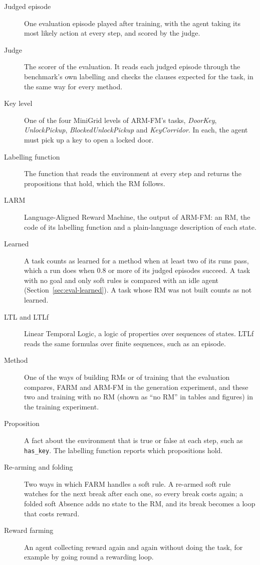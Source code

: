 \documentclass[11pt,english,listoffigures,listoftables]{tfgetsinf}
\newcommand{\env}[1]{\textsf{\slshape #1}}  %
\begin{document}
\begin{description}
    \item[Judged episode] One evaluation episode played after training, with the agent taking its most likely action at every step, and scored by the judge.
    \item[Judge] The scorer of the evaluation. It reads each judged episode through the benchmark's own labelling and checks the clauses expected for the task, in the same way for every method.
    \item[Key level] One of the four MiniGrid levels of ARM-FM's tasks, \env{DoorKey}, \env{UnlockPickup}, \env{BlockedUnlockPickup} and \env{KeyCorridor}. In each, the agent must pick up a key to open a locked door.
    \item[Labelling function] The function that reads the environment at every step and returns the propositions that hold, which the RM follows.
    \item[LARM] Language-Aligned Reward Machine, the output of ARM-FM: an RM, the code of its labelling function and a plain-language description of each state.
    \item[Learned] A task counts as learned for a method when at least two of its runs pass, which a run does when 0.8 or more of its judged episodes succeed. A task with no goal and only soft rules is compared with an idle agent (Section~\ref{sec:eval-learned}). A task whose RM was not built counts as not learned.
    \item[LTL and LTLf] Linear Temporal Logic, a logic of properties over sequences of states. LTLf reads the same formulas over finite sequences, such as an episode.
    \item[Method] One of the ways of building RMs or of training that the evaluation compares, FARM and ARM-FM in the generation experiment, and these two and training with no RM (shown as ``no RM'' in tables and figures) in the training experiment.
    \item[Proposition] A fact about the environment that is true or false at each step, such as \texttt{has\_key}. The labelling function reports which propositions hold.
    \item[Re-arming and folding] Two ways in which FARM handles a soft rule. A re-armed soft rule watches for the next break after each one, so every break costs again; a folded soft Absence adds no state to the RM, and its break becomes a loop that costs reward.
    \item[Reward farming] An agent collecting reward again and again without doing the task, for example by going round a rewarding loop.

\end{description}
\end{document}
